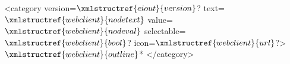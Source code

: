 <category version=$\xmlstructref{eiout}{version}$? text=$\xmlstructref{webclient}{nodetext}$ value=$\xmlstructref{webclient}{nodeval}$ 
          selectable=$\xmlstructref{webclient}{bool}$? icon=$\xmlstructref{webclient}{url}$?>
    $\xmlstructref{webclient}{outline}$*
</category>
